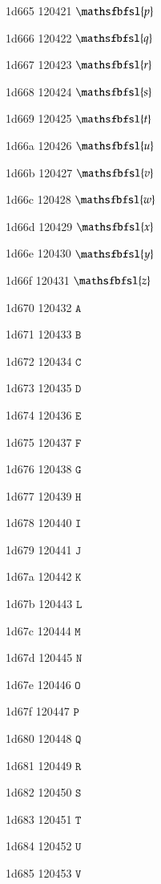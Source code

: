 \documentclass[11pt]{article}
\begin{document}
1d665 120421 \ensuremath{\mathsfbfsl{p}}

1d666 120422 \ensuremath{\mathsfbfsl{q}}

1d667 120423 \ensuremath{\mathsfbfsl{r}}

1d668 120424 \ensuremath{\mathsfbfsl{s}}

1d669 120425 \ensuremath{\mathsfbfsl{t}}

1d66a 120426 \ensuremath{\mathsfbfsl{u}}

1d66b 120427 \ensuremath{\mathsfbfsl{v}}

1d66c 120428 \ensuremath{\mathsfbfsl{w}}

1d66d 120429 \ensuremath{\mathsfbfsl{x}}

1d66e 120430 \ensuremath{\mathsfbfsl{y}}

1d66f 120431 \ensuremath{\mathsfbfsl{z}}

1d670 120432 \ensuremath{\mathtt{A}}

1d671 120433 \ensuremath{\mathtt{B}}

1d672 120434 \ensuremath{\mathtt{C}}

1d673 120435 \ensuremath{\mathtt{D}}

1d674 120436 \ensuremath{\mathtt{E}}

1d675 120437 \ensuremath{\mathtt{F}}

1d676 120438 \ensuremath{\mathtt{G}}

1d677 120439 \ensuremath{\mathtt{H}}

1d678 120440 \ensuremath{\mathtt{I}}

1d679 120441 \ensuremath{\mathtt{J}}

1d67a 120442 \ensuremath{\mathtt{K}}

1d67b 120443 \ensuremath{\mathtt{L}}

1d67c 120444 \ensuremath{\mathtt{M}}

1d67d 120445 \ensuremath{\mathtt{N}}

1d67e 120446 \ensuremath{\mathtt{O}}

1d67f 120447 \ensuremath{\mathtt{P}}

1d680 120448 \ensuremath{\mathtt{Q}}

1d681 120449 \ensuremath{\mathtt{R}}

1d682 120450 \ensuremath{\mathtt{S}}

1d683 120451 \ensuremath{\mathtt{T}}

1d684 120452 \ensuremath{\mathtt{U}}

1d685 120453 \ensuremath{\mathtt{V}}
\end{document}

